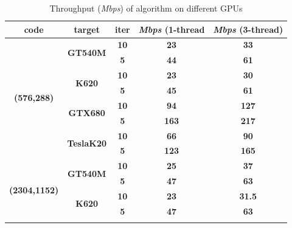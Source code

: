 \documentclass[conference]{IEEEtran}
\begin{document}
\begin{table}[h]
\centering
\caption{Throughput (\textit{Mbps}) of algorithm on different GPUs}\label{table:gpus}
\begin{tabular}{@{}cc|c|cc@{}}
\toprule
\textbf{code}                        & \textbf{target}                    & \textbf{iter} & \textit{Mbps} (1-thread}) & \textit{Mbps} (3-thread)  \\ \midrule
\multirow{8}{*}{\textbf{(576,288)}}  & \multirow{2}{*}{\textbf{GT540M}}   & \textbf{10}   & \textbf{23}  & \textbf{33}   \\ \cmidrule(l){3-5} 
                                     &                                    & \textbf{5}    & \textbf{44}  & \textbf{61}   \\ \cmidrule(l){2-5} 
                                     & \multirow{2}{*}{\textbf{K620}}     & \textbf{10}   & \textbf{23}  & \textbf{30}   \\ \cmidrule(l){3-5} 
                                     &                                    & \textbf{5}    & \textbf{45}  & \textbf{61}   \\ \cmidrule(l){2-5} 
                                     & \multirow{2}{*}{\textbf{GTX680}}   & \textbf{10}   & \textbf{94}  & \textbf{127}  \\ \cmidrule(l){3-5} 
                                     &                                    & \textbf{5}    & \textbf{163} & \textbf{217}  \\ \cmidrule(l){2-5} 
                                     & \multirow{2}{*}{\textbf{TeslaK20}} & \textbf{10}   & \textbf{66}  & \textbf{90}   \\ \cmidrule(l){3-5} 
                                     &                                    & \textbf{5}    & \textbf{123} & \textbf{165}  \\ \midrule
\multirow{8}{*}{\textbf{(2304,1152)}}& \multirow{2}{*}{\textbf{GT540M}}   & \textbf{10}   & \textbf{25}  & \textbf{37}   \\ \cmidrule(l){3-5} 
                                     &                                    & \textbf{5}    & \textbf{47}  & \textbf{63}   \\ \cmidrule(l){2-5} 
                                     & \multirow{2}{*}{\textbf{K620}}     & \textbf{10}   & \textbf{23}  & \textbf{31.5} \\ \cmidrule(l){3-5}
                                     &                                    & \textbf{5}    & \textbf{47}  & \textbf{63}    \\ \cmidrule(l){2-5}

\end{tabular}
\end{table}
\end{document}
